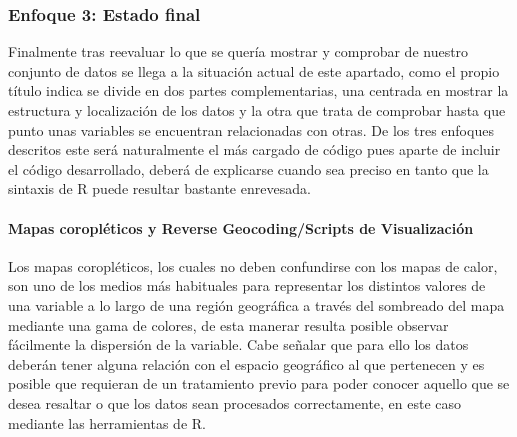 \documentclass[11pt, a4paper]{article} %
\begin{document}
\subsubsection{Enfoque 3: Estado final}
Finalmente tras reevaluar lo que se quería mostrar y comprobar de nuestro conjunto de datos se llega a la situación actual de este apartado, como el propio título indica se divide en dos partes complementarias, una centrada en mostrar la estructura y localización de los datos y la otra que trata de comprobar hasta que punto unas variables se encuentran relacionadas con otras. De los tres enfoques descritos este será naturalmente el más cargado de código pues aparte de incluir el código desarrollado, deberá de explicarse cuando sea preciso en tanto que la sintaxis de R puede resultar bastante enrevesada.
\paragraph{Mapas coropléticos y Reverse Geocoding/Scripts de Visualización}
Los mapas coropléticos, los cuales no deben confundirse con los mapas de calor, son uno de los medios más habituales para representar los distintos valores de una variable a lo largo de una región geográfica a través del sombreado del mapa mediante una gama de colores, de esta manerar resulta posible observar fácilmente la dispersión de la variable. Cabe señalar que para ello los datos deberán tener alguna relación con el espacio geográfico al que pertenecen y es posible que requieran de un tratamiento previo para poder conocer aquello que se desea resaltar o que los datos sean procesados correctamente, en este caso mediante las herramientas de R. 
\end{document}
